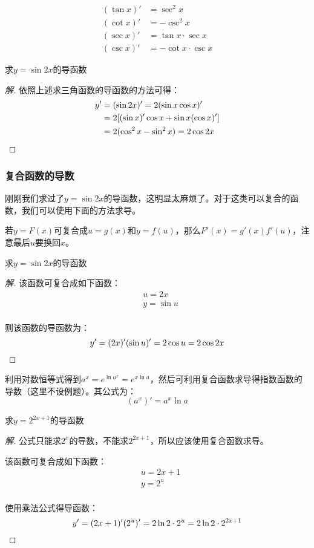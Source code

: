 \[
	\begin{aligned}
		(\tan x)'&=\sec^2x \\
		(\cot x)'&=-\csc^2x \\
		(\sec x)'&=\tan x\cdot\sec x \\
		(\csc x)'&=-\cot x\cdot\csc x
	\end{aligned}
\]

\begin{example}
	求$y=\sin2x$的导函数
\end{example}
\begin{proof}[解]
	依照上述求三角函数的导函数的方法可得：
	\[\begin{aligned}
		y'&=(\sin2x)'=2(\sin x\cos x)' \\
		  &=2[(\sin x)'\cos x+\sin x(\cos x)'] \\
		  &=2(\cos^2x-\sin^2x)=2\cos2x
	\end{aligned}\qedhere\]
\end{proof}

\subsubsection{复合函数的导数}
刚刚我们求过了$y=\sin2x$的导函数，这明显太麻烦了。对于这类可以复合的函数，我们可以使用下面的方法求导。

若$y=F(x)$可复合成$u=g(x)$和$y=f(u)$，那么$F'(x)=g'(x)f'(u)$，注意最后$u$要换回$x$。

\begin{example}
	求$y=\sin2x$的导函数
\end{example}
\begin{proof}[解]
	该函数可复合成如下函数：
	\[\begin{aligned}
		&u=2x \\
		&y=\sin u \\
	\end{aligned}\]

	则该函数的导函数为：\[y'=(2x)'(\sin u)'=2\cos u=2\cos 2x\qedhere\]
\end{proof}

利用对数恒等式得到$a^x=e^{\ln a^x}=e^{x\ln a}$，然后可利用复合函数求导得指数函数的导数（这里不设例题）。其公式为：\[(a^x)'=a^x\ln a\]

\begin{example}
	求$y=2^{2x+1}$的导函数
\end{example}
\begin{proof}[解]
	公式只能求$2^x$的导数，不能求$2^{2x+1}$，所以应该使用复合函数求导。

	该函数可复合成如下函数：
	\[\begin{aligned}
		&u=2x+1 \\
		&y=2^u \\
	\end{aligned}\]

	使用乘法公式得导函数：\[y'=(2x+1)'(2^u)'=2\ln 2\cdot2^u=2\ln2\cdot2^{2x+1}\qedhere\]
\end{proof}

